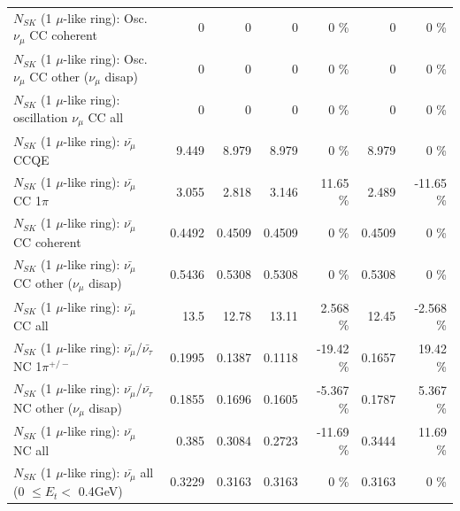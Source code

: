 \begin{table}
\begin{tabular}{| l | r | r | r  r | r  r |}
                        $N_{SK}$ (1 $\mu$-like ring): Osc. $\nu_\mu$ CC coherent &               0 &               0 &               0 &        0 \%  &               0 &        0 \%  \\ 
         $N_{SK}$ (1 $\mu$-like ring): Osc. $\nu_\mu$ CC other ($\nu_\mu$ disap) &               0 &               0 &               0 &        0 \%  &               0 &        0 \%  \\ 
                      $N_{SK}$ (1 $\mu$-like ring): oscillation $\nu_\mu$ CC all &               0 &               0 &               0 &        0 \%  &               0 &        0 \%  \\ 
\hline
\hline
                              $N_{SK}$ (1 $\mu$-like ring): $\bar{\nu_\mu}$ CCQE &           9.449 &           8.979 &           8.979 &        0 \%  &           8.979 &        0 \%  \\ 
                         $N_{SK}$ (1 $\mu$-like ring): $\bar{\nu_\mu}$ CC 1$\pi$ &           3.055 &           2.818 &           3.146 &    11.65 \%  &           2.489 &   -11.65 \%  \\ 
                       $N_{SK}$ (1 $\mu$-like ring): $\bar{\nu_\mu}$ CC coherent &          0.4492 &          0.4509 &          0.4509 &        0 \%  &          0.4509 &        0 \%  \\ 
        $N_{SK}$ (1 $\mu$-like ring): $\bar{\nu_\mu}$ CC other ($\nu_\mu$ disap) &          0.5436 &          0.5308 &          0.5308 &        0 \%  &          0.5308 &        0 \%  \\ 
                          $N_{SK}$ (1 $\mu$-like ring): $\bar{\nu_{\mu}}$ CC all &            13.5 &           12.78 &           13.11 &    2.568 \%  &           12.45 &   -2.568 \%  \\ 
\hline
  $N_{SK}$ (1 $\mu$-like ring): $\bar{\nu_\mu}$/$\bar{\nu_\tau}$ NC 1$\pi^{+/-}$ &          0.1995 &          0.1387 &          0.1118 &   -19.42 \%  &          0.1657 &    19.42 \%  \\ 
$N_{SK}$ (1 $\mu$-like ring): $\bar{\nu_\mu}$/$\bar{\nu_\tau}$ NC other ($\nu_\mu$ disap) &          0.1855 &          0.1696 &          0.1605 &   -5.367 \%  &          0.1787 &    5.367 \%  \\ 
                          $N_{SK}$ (1 $\mu$-like ring): $\bar{\nu_{\mu}}$ NC all &           0.385 &          0.3084 &          0.2723 &   -11.69 \%  &          0.3444 &    11.69 \%  \\ 
\hline
   $N_{SK}$ (1 $\mu$-like ring): $\bar{\nu_{\mu}}$ all (0 $\leq E_{t} <$ 0.4GeV) &          0.3229 &          0.3163 &          0.3163 &        0 \%  &          0.3163 &        0 \%  \\ 

\end{tabular}
\end{table}
